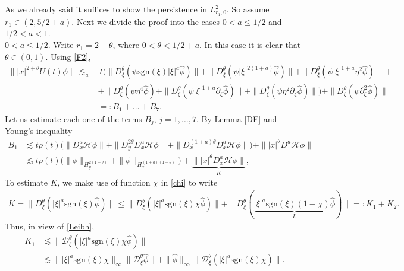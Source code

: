 \documentclass[reqno]{amsart}
\newcommand{\ha}{\hat{\phi}}
\newcommand{\h}{\mathcal H}
\newcommand{\Dt}{\mathcal{D}^{\theta}_\xi}
\newcommand{\dte}{D^{\theta}_\xi}
\newcommand{\p}{\partial}
\newcommand{\sgn}{\text{sgn}}
\numberwithin{equation}{section}
\begin{document}
 As we already said it suffices to show the persistence in $L^2_{r_1,0}$. So assume $r_1\in (2,5/2+a)$. Next we divide the proof into the cases  $0<a\leq 1/2$ and $1/2<a<1$.\\

 $0<a\leq 1/2$. Write  $r_1=2+\theta$, where $0<\theta<1/2+a$. In this case it is clear that $\theta\in(0,1)$.
Using \eqref{F2}, 
\begin{equation}
\begin{split}\label{D2}
\||x|^{2+\theta}U(t)\phi\|\lesssim_a& \ t\Big (\|\dte(\psi\sgn(\xi)|\xi|^a \ha)\|+\|\dte(\psi|\xi|^{2(1+a)} \ha)\|+\|\dte(\psi|\xi|^{1+a}\eta^2 \ha)\|+\\
&+\|\dte(\psi \eta^4 \ha)+\|\dte(\psi|\xi|^{1+a}\p_\xi \ha)\|+\|\dte(\psi \eta^2 \p_\xi \ha)\|\Big)+\|\dte(\psi \p_\xi^2 \ha)\|\\
&=:B_1+\ldots+B_7.
\end{split}
\end{equation}
Let us estimate each one of the terms $B_j$, $j=1,\ldots,7$. By Lemma \ref{DF} and Young's inequality
\begin{equation*}
\begin{split}
B_1 &\lesssim t\rho(t) \Big(\|D_x^{a} \h \phi\|+\|D_y^{2\theta}D_x^a \h \phi\|+\|D_x^{(1+a)\theta}D^a_x \h \phi\|\Big)+\||x|^{\theta}D^a \h \phi\|\\
&\lesssim t\rho(t)\Big(\|\phi\|_{H^{2(1+\theta)}_y}+\| \phi\|_{H^{(1+a)(1+\theta)}_x}\Big)+\underbrace{\||x|^{\theta}D^a_x \h \phi\|}_{K},
\end{split}
\end{equation*}
To estimate $K$, we make use of function $\chi$ in \eqref{chi} to  write
\begin{equation*}
\begin{split}
K=\|D_\xi^\theta (|\xi|^a \sgn(\xi)\ha)\|
\leq \|D^{\theta}_\xi (|\xi|^{a}\sgn(\xi)\chi \ha)\|+\|D^{\theta}_\xi (\underbrace{|\xi|^{a}\sgn(\xi)(1-\chi)\ha}_{L})\|=: K_{1}+K_{2}.
\end{split}
\end{equation*}
Thus, in view of \eqref{Leibh},
\begin{equation}\label{K1term}
\begin{split}
K_{1}& \lesssim \|\Dt (|\xi|^a \sgn(\xi)\chi \ha)\|\\
&\lesssim\||\xi|^a \sgn(\xi)\chi\|_\infty \|\Dt \ha\|+\|\ha\|_\infty \|\Dt (|\xi|^a \sgn(\xi)\chi)\|.
\end{split}
\end{equation}
\end{document}
